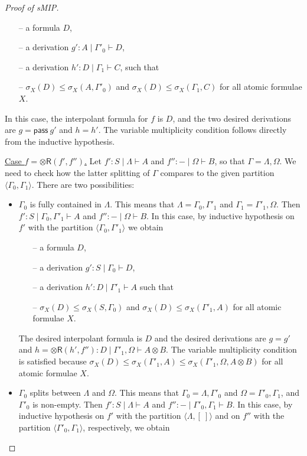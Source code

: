 \documentclass[sn-mathphys-num]{sn-jnl}%
\newcommand{\GG}{\Gamma}
\newcommand{\GL}{\Lambda}
\newcommand{\GO}{\Omega}
\newcommand{\vd}{\vdash}
\newcommand{\tr}{\otimes\mathsf{R}}
\newcommand{\pass}{\mathsf{pass}}
\newcommand{\ot}{\otimes}
\newcommand{\gs}[1]{\sigma_{X} (#1)}
\newcommand{\sMIP}{\textsf{sMIP}}
\theoremstyle{thmstyleone}%
\theoremstyle{thmstyletwo}%
\theoremstyle{thmstylethree}%
\begin{document}
\begin{proof}[Proof of \sMIP]
\begin{itemize}
    \begin{itemize}
      \item[--] a formula $D$,
      \item[--] a derivation $g' : A \mid \GG'_0 \vd D$,
      \item[--] a derivation $h' : D \mid \GG_1 \vd C$, such that
      \item[--] $\gs{D} \leq \gs{A, \GG'_0} $ and $\gs{D} \leq \gs{\GG_1, C}$ for all atomic formulae $X$.
    \end{itemize}
    In this case, the interpolant formula for $f$ is $D$, and the two desired derivations are $g = \pass \ g'$ and $h = h'$.
    The variable multiplicity condition follows directly from the inductive hypothesis.
  \end{itemize} 
  \underline{Case $f = \tr (f',f'')$.} Let $f' : S \mid \GL \vd A$ and $f'' : {-} \mid \GO \vd B$, so that $\GG = \GL,\GO$. We need to check how the latter splitting of $\GG$ compares to the given partition $\langle \GG_0,\GG_1 \rangle$. 
  There are two possibilities:
  \begin{itemize}
    \item $\GG_0$ is fully contained in $\GL$. 
    This means that $\GL = \GG_0 , \GG'_1$ and $\GG_1 = \GG'_1,\GO$.
    Then $f' : S \mid \GG_0 , \GG'_1 \vd A$ and $f'' : {-} \mid \GO \vd B$.
    In this case, by inductive hypothesis on $f'$ with the partition $\langle \GG_0 , \GG'_1 \rangle$ we obtain
    \begin{itemize}
      \item[--] a formula $D$,
      \item[--] a derivation $g' : S \mid \GG_0 \vd D$, 
      \item[--] a derivation $h' : D \mid \GG'_1 \vd A$ such that 
      \item[--] $\gs{D} \leq \gs{S, \GG_0} $ and $\gs{D} \leq \gs{\GG'_1 , A}$ for all atomic formulae $X$.
    \end{itemize}
    The desired interpolant formula is $D$ and the desired derivations are $g = g'$ and $h = \tr (h' , f'') : D \mid \GG'_1 , \GO \vd A \ot B$.
    The variable multiplicity condition is satisfied because $\gs{D} \leq \gs{\GG'_1 , A} \leq \gs{\GG'_1 , \GO , A \ot B}$ for all atomic formulae $X$.
    \item  $\GG_0$ splits between $\GL$ and $\GO$. 
    This means that $\GG_0 = \GL,\GG'_0$ and $\GO = \GG'_0,\GG_1$, and $\GG'_0$ is non-empty.
    Then $f' : S \mid \GL \vd A$ and $f'': {-} \mid \GG'_0, \GG_1 \vd B$.
    In this case, by inductive hypothesis on $f'$ with the partition $\langle \GL , [\ ] \rangle $ and on $f''$ with the partition $\langle \GG'_0 , \GG_1 \rangle$, respectively, we obtain

\end{itemize}
\end{proof}
\end{document}
